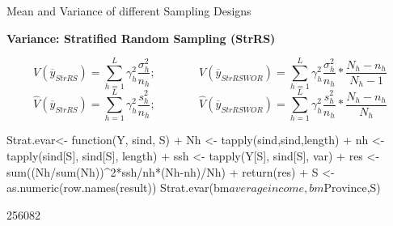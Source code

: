 \documentclass[11pt,german,hideothersubsections]{beamer}
\begin{document}
\begin{frame}[fragile]{Mean and Variance} {of different Sampling Designs}
\footnotesize{
\vspace{-.5cm}
\begin{center}
\textbf{Variance: Stratified Random Sampling (StrRS)}
\end{center}
\begin{equation*}
V(\overline{y}_{StrRS})=\sum_{h=1}^{L}\gamma_{h}^2\frac{\sigma_h^2}{n_h}\text{;~~~~~~~~~~~~}V(\overline{y}_{StrRSWOR})=\sum_{h=1}^{L}\gamma_{h}^2\frac{\sigma_h^2}{n_h}*\frac{N_h-n_h}{N_h-1}
\end{equation*}
\begin{equation*}
\hat{V}(\overline{y}_{StrRS})=\sum_{h=1}^{L}\gamma_{h}^2\frac{s_h^2}{n_h}\text{;~~~~~~~~~~~~}\hat{V}(\overline{y}_{StrRSWOR})=\sum_{h=1}^{L}\gamma_{h}^2\frac{s_h^2}{n_h}*\frac{N_h-n_h}{N_h}
\end{equation*}
\vspace{.25cm}
\begin{Schunk}
\begin{Sinput}
 Strat.evar<- function(Y, sind, S) {
+   Nh <- tapply(sind,sind,length)
+   nh <- tapply(sind[S], sind[S], length)
+   ssh <- tapply(Y[S], sind[S], var)
+   res <- sum((Nh/sum(Nh))^2*ssh/nh*(Nh-nh)/Nh)
+   return(res)
+ }
 S <- as.numeric(row.names(result))
 Strat.evar(bm$averageincome,bm$Province,S)
\end{Sinput}
\begin{Soutput}
[1] 256082
\end{Soutput}
\end{Schunk}
}
\end{frame}
\end{document}
